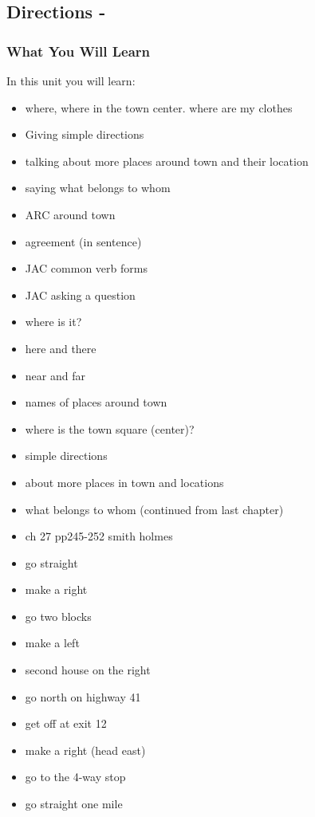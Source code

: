 \begin{multicols}
\chapter{Directions - }
\subsection{What You Will Learn}
In this unit you will learn:
\begin{itemize}
\item where, where in the town center. where are my clothes
\item Giving simple directions
\item talking about more places around town and their location
\item saying what belongs to whom
\item ARC around town
\item agreement (in sentence)
\item JAC common verb forms
\item JAC asking a question
\item where is it?
\item here and there
\item near and far
\item names of places around town
\item where is the town square (center)?
\item simple directions
\item about more places in town and locations
\item what belongs to whom (continued from last chapter)
\item ch 27 pp245-252 smith holmes
\item go straight
\item make a right
\item go two blocks
\item make a left
\item second house on the right
\item go north on highway 41
\item get off at exit 12
\item make a right (head east)
\item go to the 4-way stop
\item go straight one mile
\end{itemize}\newpage


\end{multicols}
